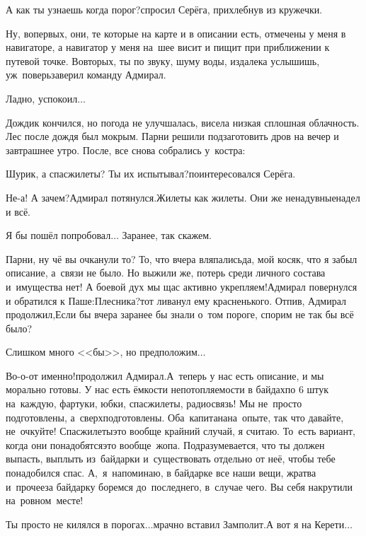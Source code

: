 \diagdash А как ты узнаешь когда порог?\mdash спросил Серёга, прихлебнув из кружечки.

\diagdash Ну, во\sdash первых, они, те которые на карте и в описании есть, отмечены у меня в навигаторе, а навигатор у меня на~шее висит и пищит при приближении к путевой точке. Во\sdash вторых, ты по звуку, шуму воды, издалека услышишь, уж~поверь\mdash заверил команду Адмирал.

\diagdash Ладно, успокоил$\ldots$

Дождик кончился, но погода не улучшалась, висела низкая сплошная облачность. Лес после дождя был мокрым. Парни решили подзаготовить дров на вечер и завтрашнее утро. После, все снова собрались у~костра:

\diagdash Шурик, а спасжилеты? Ты их испытывал?\mdash поинтересовался Серёга.

\diagdash Не-а! А зачем?\mdash Адмирал потянулся.\mdash Жилеты как жилеты. Они же ненадувные\mdash надел и всё.

\diagdash Я бы пошёл попробовал$\ldots$ Заранее, так скажем.

\diagdash Парни, ну чё вы очканули то? То, что вчера вляпались\mdash да, мой косяк, что я забыл описание, а~связи не было. Но выжили же, потерь среди личного состава и~имущества нет! А боевой дух мы щас активно укрепляем!\mdash Адмирал повернулся и обратился к Паше:\mdash Плесни\sdash ка?\mdash тот ливанул ему красненького. Отпив, Адмирал продолжил,\mdash Если бы вчера заранее бы знали о~том пороге, спорим не так бы всё было?

\diagdash Слишком много <<бы>>, но предположим$\ldots$

\diagdash Во-о-от именно!\mdash продолжил Адмирал.\mdash А~теперь у нас есть описание, и мы морально готовы. У нас есть ёмкости непотопляемости в байдах\mdash по 6 штук на~каждую, фартуки, юбки, спасжилеты, радиосвязь! Мы не~просто подготовлены, а~сверхподготовлены. Оба~капитана\mdash на~опыте, так что давайте, не~очкуйте! Спасжилеты\mdash это вообще крайний случай, я считаю. То~есть вариант, когда они понадобятся\mdash это вообще~жопа. Подразумевается, что ты должен выпасть, выплыть из~байдарки и~существовать отдельно от неё, чтобы тебе понадобился спас. А,~я~напоминаю, в байдарке все наши вещи, жратва и~прочее\mdash за байдарку боремся до~последнего, в~случае чего. Вы себя накрутили на~ровном~месте!

\diagdash Ты просто не килялся в порогах$\ldots$\mdash мрачно вставил Замполит.\mdash А вот я на Керети$\ldots$

